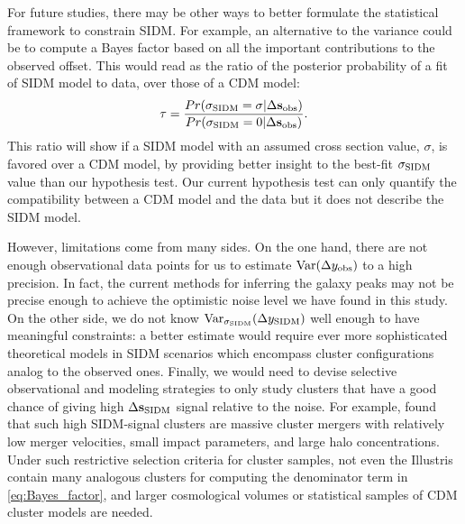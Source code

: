 \documentclass[usenatbib]{mn2e}
\newcommand{\offset}{\Delta {\bf s}}
\newcommand{\SIDM}{{\rm SIDM}}
\newcommand{\Var}{\mathrm{Var}}
\begin{document}
{For future studies, there may be other ways to better formulate the
statistical framework to constrain SIDM. For example, an alternative to the variance could be to compute a Bayes factor based
on all the important contributions to the observed offset. This would read as the ratio of the posterior probability of a fit of SIDM model to data,
over those of a CDM model:
\begin{equation}
	\tau = \frac{Pr(\sigma_{\SIDM} = \sigma | \offset_{\rm
	obs})}{Pr(\sigma_{\SIDM} = 0 | \offset_{\rm obs})}.
	\label{eq:Bayes_factor}
\end{equation}
This ratio will show if a SIDM model with an assumed cross section value, $\sigma$,
is favored over a CDM model, by providing better
insight to the best-fit $\sigma_\SIDM$ value than our hypothesis test.
Our current hypothesis test can only quantify the compatibility between a CDM
model and the data but it does not describe the SIDM model. 

However, limitations come from many sides. On the one hand, there are not enough observational data points for us to estimate 
$\Var(\Delta y_{\rm obs})$ to a high precision. In fact, the current methods for inferring 
the galaxy peaks may not be precise enough to achieve the optimistic noise level we have found in this study. On the other side, we do not know $\Var_{\sigma_\SIDM}(\Delta y_\SIDM)$ well enough
to have meaningful constraints: a better estimate would require ever more sophisticated theoretical models in SIDM scenarios which encompass cluster configurations analog to the observed ones. 
Finally, we would need to devise selective observational and modeling strategies to only study clusters that have a good chance of giving high $\offset_\SIDM$ signal
relative to the noise. For example, \cite{Kim:2016} found that such high SIDM-signal clusters are massive cluster mergers with relatively low merger
velocities, small impact parameters, and large halo concentrations. 
Under such restrictive selection criteria for cluster samples, not even the Illustris contain many analogous clusters for computing the denominator term in
\ref{eq:Bayes_factor}, and larger cosmological volumes or statistical samples of CDM cluster models are needed.


}
\end{document}
